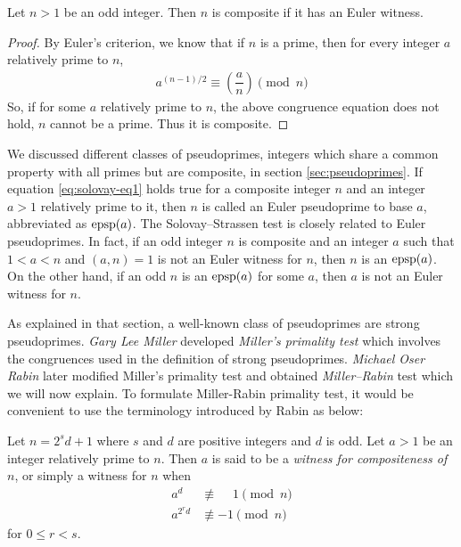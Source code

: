 \documentclass{subfiles}
\begin{document}
		\begin{theorem}
			Let $n>1$ be an odd integer. Then $n$ is composite if it has an Euler witness.
		\end{theorem}

		\begin{proof}
			By Euler's criterion, we know that if $n$ is a prime, then for every integer $a$ relatively prime to $n$,
				\begin{align}
					a^{(n-1)/2}  \equiv \left(\dfrac{a}{n}\right) \pmod n \label{eq:solovay-eq1}
				\end{align}
			So, if for some $a$ relatively prime to $n$, the above congruence equation does not hold, $n$ cannot be a prime. Thus it is composite.
		\end{proof}

		\begin{remark}
					We discussed different classes of pseudoprimes, integers which share a common property with all primes but are composite, in section \eqref{sec:pseudoprimes}. If equation \eqref{eq:solovay-eq1} holds true for a composite integer $n$ and an integer $a>1$ relatively prime to it, then $n$ is called an Euler pseudoprime to base $a$, abbreviated as $\operatorname{epsp}(a)$. The Solovay--Strassen test is closely related to Euler pseudoprimes. In fact, if an odd integer $n$ is composite and an integer $a$ such that $1<a<n$ and $(a,n)=1$ is not an Euler witness for $n$, then $n$ is an $\operatorname{epsp}(a)$. On the other hand, if an odd $n$ is an $\operatorname{epsp}(a)$ for some $a$, then $a$ is not an Euler witness for $n$.
		\end{remark}

	 As explained in that section, a well-known class of pseudoprimes are strong pseudoprimes. \textit{Gary Lee Miller} developed \textit{Miller's primality test} which involves the congruences used in the definition of strong pseudoprimes. \textit{Michael Oser Rabin} later modified Miller's primality test and obtained \textit{Miller--Rabin} test which we will now explain. To formulate Miller-Rabin primality test, it would be convenient to use the terminology introduced by Rabin as below:

		\begin{definition}
			Let $n=2^sd+1$ where $s$ and $d$ are positive integers and $d$ is odd. Let $a>1$ be an integer relatively prime to $n$. Then $a$ is said to be a \textit{witness for compositeness of $n$}, or simply a witness for $n$ when
				\begin{align*}
				a^d &\not\equiv \phantom{-} 1 \pmod n\\
				a^{2^rd} &\not\equiv -1 \pmod n
				\end{align*}
			for $0\leq r<s$.
		\end{definition}
\end{document}
